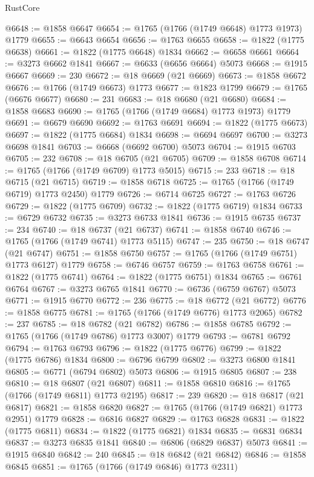 \begin{lexlean}{RustCore}
\begin{coremodule}
@6648 := @1858 @6647
@6654 := @1765 (@1766 (@1749 @6648) @1773 @1973) @1779
@6655 := @6643 @6654
@6656 := @1763 @6655
@6658 := @1822 (@1775 @6638)
@6661 := @1822 (@1775 @6648) @1834
@6662 := @6658 @6661
@6664 := @3273 @6662 @1841
@6667 := @6633 (@6656 @6664) @5073
@6668 := @1915 @6667
@6669 := 230
@6672 := @18 @6669 (@21 @6669)
@6673 := @1858 @6672
@6676 := @1766 (@1749 @6673) @1773
@6677 := @1823 @1799
@6679 := @1765 (@6676 @6677)
@6680 := 231
@6683 := @18 @6680 (@21 @6680)
@6684 := @1858 @6683
@6690 := @1765 (@1766 (@1749 @6684) @1773 @1973) @1779
@6691 := @6679 @6690
@6692 := @1763 @6691
@6694 := @1822 (@1775 @6673)
@6697 := @1822 (@1775 @6684) @1834
@6698 := @6694 @6697
@6700 := @3273 @6698 @1841
@6703 := @6668 (@6692 @6700) @5073
@6704 := @1915 @6703
@6705 := 232
@6708 := @18 @6705 (@21 @6705)
@6709 := @1858 @6708
@6714 := @1765 (@1766 (@1749 @6709) @1773 @5015)
@6715 := 233
@6718 := @18 @6715 (@21 @6715)
@6719 := @1858 @6718
@6725 := @1765 (@1766 (@1749 @6719) @1773 @2450) @1779
@6726 := @6714 @6725
@6727 := @1763 @6726
@6729 := @1822 (@1775 @6709)
@6732 := @1822 (@1775 @6719) @1834
@6733 := @6729 @6732
@6735 := @3273 @6733 @1841
@6736 := @1915 @6735
@6737 := 234
@6740 := @18 @6737 (@21 @6737)
@6741 := @1858 @6740
@6746 := @1765 (@1766 (@1749 @6741) @1773 @5115)
@6747 := 235
@6750 := @18 @6747 (@21 @6747)
@6751 := @1858 @6750
@6757 := @1765 (@1766 (@1749 @6751) @1773 @6127) @1779
@6758 := @6746 @6757
@6759 := @1763 @6758
@6761 := @1822 (@1775 @6741)
@6764 := @1822 (@1775 @6751) @1834
@6765 := @6761 @6764
@6767 := @3273 @6765 @1841
@6770 := @6736 (@6759 @6767) @5073
@6771 := @1915 @6770
@6772 := 236
@6775 := @18 @6772 (@21 @6772)
@6776 := @1858 @6775
@6781 := @1765 (@1766 (@1749 @6776) @1773 @2065)
@6782 := 237
@6785 := @18 @6782 (@21 @6782)
@6786 := @1858 @6785
@6792 := @1765 (@1766 (@1749 @6786) @1773 @3007) @1779
@6793 := @6781 @6792
@6794 := @1763 @6793
@6796 := @1822 (@1775 @6776)
@6799 := @1822 (@1775 @6786) @1834
@6800 := @6796 @6799
@6802 := @3273 @6800 @1841
@6805 := @6771 (@6794 @6802) @5073
@6806 := @1915 @6805
@6807 := 238
@6810 := @18 @6807 (@21 @6807)
@6811 := @1858 @6810
@6816 := @1765 (@1766 (@1749 @6811) @1773 @2195)
@6817 := 239
@6820 := @18 @6817 (@21 @6817)
@6821 := @1858 @6820
@6827 := @1765 (@1766 (@1749 @6821) @1773 @2951) @1779
@6828 := @6816 @6827
@6829 := @1763 @6828
@6831 := @1822 (@1775 @6811)
@6834 := @1822 (@1775 @6821) @1834
@6835 := @6831 @6834
@6837 := @3273 @6835 @1841
@6840 := @6806 (@6829 @6837) @5073
@6841 := @1915 @6840
@6842 := 240
@6845 := @18 @6842 (@21 @6842)
@6846 := @1858 @6845
@6851 := @1765 (@1766 (@1749 @6846) @1773 @2311)

\end{coremodule}
\end{lexlean}
